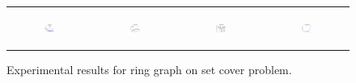 \begin{figure}[ht]
\begin{tabular}{cccc}
	  \begin{subfigure}[h]{0.22\textwidth}
	  	\includegraphics[width=110pt]{images/runtime_ring_maxgraphcut.eps}
			\caption{}
			\label{appfig:runtime_ring_maxgraphcut}
	  \end{subfigure} &
	  \begin{subfigure}[h]{0.22\textwidth}
	  	\includegraphics[width=110pt]{images/speedup_ring_maxgraphcut.eps}
			\caption{}
			\label{appfig:speedup_ring_maxgraphcut}
	  \end{subfigure} &
	  \begin{subfigure}[h]{0.22\textwidth}
	  	\includegraphics[width=110pt]{images/diffFA_CF2G_ring_maxgraphcut.eps}
			\caption{}
			\label{appfig:diffFA_CF2G_ring_maxgraphcut}
	  \end{subfigure} &
	  \begin{subfigure}[h]{0.22\textwidth}
	  	\includegraphics[width=110pt]{images/validated_CC2G_ring_maxgraphcut.eps}
			\caption{}
			\label{appfig:validated_CC2G_ring_maxgraphcut.eps}
	  \end{subfigure} \\
  \end{tabular}
  \caption{\footnotesize Experimental results for ring graph on set cover problem.}
\label{appfig:results_adversarial}
\end{figure}












